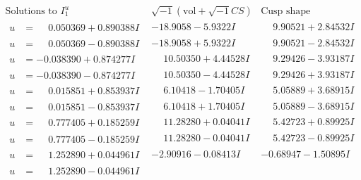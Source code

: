 \documentclass[1p]{elsarticle_modified}
\theoremstyle{definition}
\newcommand{\I}{\sqrt{-1}}
\begin{document}
$$\begin{array}{c|c|c}  
\text{Solutions to }I^u_{1}& \I (\text{vol} + \sqrt{-1}CS) & \text{Cusp shape}\\
 \hline 
\begin{aligned}
u &= \phantom{-}0.050369 + 0.890388 I\end{aligned}
 & -18.9058 - 5.9322 I & \phantom{-}9.90521 + 2.84532 I \\ \hline\begin{aligned}
u &= \phantom{-}0.050369 - 0.890388 I\end{aligned}
 & -18.9058 + 5.9322 I & \phantom{-}9.90521 - 2.84532 I \\ \hline\begin{aligned}
u &= -0.038390 + 0.874277 I\end{aligned}
 & \phantom{-}10.50350 + 4.44528 I & \phantom{-}9.29426 - 3.93187 I \\ \hline\begin{aligned}
u &= -0.038390 - 0.874277 I\end{aligned}
 & \phantom{-}10.50350 - 4.44528 I & \phantom{-}9.29426 + 3.93187 I \\ \hline\begin{aligned}
u &= \phantom{-}0.015851 + 0.853937 I\end{aligned}
 & \phantom{-}6.10418 - 1.70405 I & \phantom{-}5.05889 + 3.68915 I \\ \hline\begin{aligned}
u &= \phantom{-}0.015851 - 0.853937 I\end{aligned}
 & \phantom{-}6.10418 + 1.70405 I & \phantom{-}5.05889 - 3.68915 I \\ \hline\begin{aligned}
u &= \phantom{-}0.777405 + 0.185259 I\end{aligned}
 & \phantom{-}11.28280 + 0.04041 I & \phantom{-}5.42723 + 0.89925 I \\ \hline\begin{aligned}
u &= \phantom{-}0.777405 - 0.185259 I\end{aligned}
 & \phantom{-}11.28280 - 0.04041 I & \phantom{-}5.42723 - 0.89925 I \\ \hline\begin{aligned}
u &= \phantom{-}1.252890 + 0.044961 I\end{aligned}
 & -2.90916 - 0.08413 I & -0.68947 - 1.50895 I \\ \hline\begin{aligned}
u &= \phantom{-}1.252890 - 0.044961 I\end{aligned}

\end{array}$$
\end{document}
